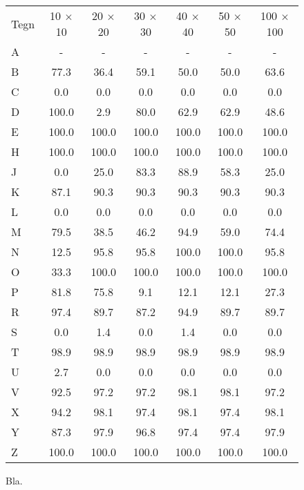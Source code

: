 \begin{figure}[htp]
\centering
\begin{tabular}{|l|c|c|c|c|c|c|}\hline
\rowcolor[gray]{0.9} \multicolumn{7}{|>{\columncolor[gray]{0.9}}c|}{\textbf{Forenings-billeder}} \\ \hline
Tegn & 10 $\times$ 10 & 20 $\times$ 20 & 30 $\times$ 30 & 40 $\times$ 40 & 50 $\times$ 50 & 100 $\times$ 100\\\hline
A & - & - & - & - & - & -\\\hline
B & 77.3 & 36.4 & 59.1 & 50.0 & 50.0 & 63.6\\\hline
C & 0.0 & 0.0 & 0.0 & 0.0 & 0.0 & 0.0\\\hline
D & 100.0 & 2.9 & 80.0 & 62.9 & 62.9 & 48.6\\\hline
E & 100.0 & 100.0 & 100.0 & 100.0 & 100.0 & 100.0\\\hline
H & 100.0 & 100.0 & 100.0 & 100.0 & 100.0 & 100.0\\\hline
J & 0.0 & 25.0 & 83.3 & 88.9 & 58.3 & 25.0\\\hline
K & 87.1 & 90.3 & 90.3 & 90.3 & 90.3 & 90.3\\\hline
L & 0.0 & 0.0 & 0.0 & 0.0 & 0.0 & 0.0\\\hline
M & 79.5 & 38.5 & 46.2 & 94.9 & 59.0 & 74.4\\\hline
N & 12.5 & 95.8 & 95.8 & 100.0 & 100.0 & 95.8\\\hline
O & 33.3 & 100.0 & 100.0 & 100.0 & 100.0 & 100.0\\\hline
P & 81.8 & 75.8 & 9.1 & 12.1 & 12.1 & 27.3\\\hline
R & 97.4 & 89.7 & 87.2 & 94.9 & 89.7 & 89.7\\\hline
S & 0.0 & 1.4 & 0.0 & 1.4 & 0.0 & 0.0\\\hline
T & 98.9 & 98.9 & 98.9 & 98.9 & 98.9 & 98.9\\\hline
U & 2.7 & 0.0 & 0.0 & 0.0 & 0.0 & 0.0\\\hline
V & 92.5 & 97.2 & 97.2 & 98.1 & 98.1 & 97.2\\\hline
X & 94.2 & 98.1 & 97.4 & 98.1 & 97.4 & 98.1\\\hline
Y & 87.3 & 97.9 & 96.8 & 97.4 & 97.4 & 97.9\\\hline
Z & 100.0 & 100.0 & 100.0 & 100.0 & 100.0 & 100.0\\\hline
\end{tabular}
\caption{Bla.}
\label{fig:test:and_bogstav}
\end{figure}

